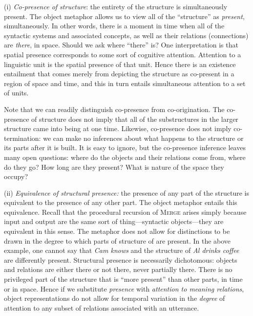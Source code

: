 (i) \textit{Co-presence of structure}: the entirety of the structure is simultaneously present. The object metaphor allows us to view all of the “structure” as \textit{present}, simultaneously. In other words, there is a moment in time when all of the syntactic systems and associated concepts, as well as their relations (connections) are \textit{there}, in space. Should we ask where “there” is? One interpretation is that spatial presence corresponds to some sort of cognitive attention. Attention to a linguistic unit is the spatial presence of that unit. Hence there is an existence entailment that comes merely from depicting the structure as co-present in a region of space and time, and this in turn entails simultaneous attention to a set of units.

  Note that we can readily distinguish co-presence from co-origination. The co-presence of structure does not imply that all of the substructures in the larger structure came into being at one time. Likewise, co-presence does not imply co-termination: we can make no inferences about what happens to the structure or its parts after it is built. It is easy to ignore, but the co-presence inference leaves many open questions: where do the objects and their relations come from, where do they go? How long are they present? What is nature of the space they occupy?

(ii) \textit{Equivalence of structural presence:} the presence of any part of the structure is equivalent to the presence of any other part. The object metaphor entails this equivalence. Recall that the procedural recursion of \textsc{Merge} arises simply because input and output are the same sort of thing—syntactic objects—they are equivalent in this sense. The metaphor does not allow for distinctions to be drawn in the degree to which parts of structure of are present. In the above example, one cannot say that \textit{Cam knows} and the structure of \textit{Al drinks coffee} are differently present. Structural presence is necessarily dichotomous: objects and relations are either there or not there, never partially there. There is no privileged part of the structure that is “more present” than other parts, in time or in space. Hence if we substitute \textit{presence} with \textit{attention to meaning relations}, object representations do not allow for temporal variation in the \textit{degree} of attention to any subset of relations associated with an utterance. 

